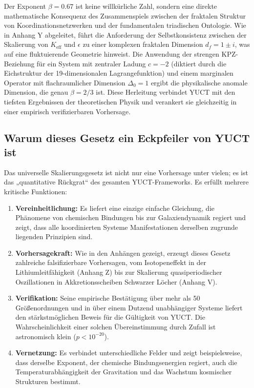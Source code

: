 \documentclass[11pt,a4paper]{article}
\begin{document}
	Der Exponent \(\beta = 0.67\) ist keine willkürliche Zahl, sondern eine direkte mathematische Konsequenz des Zusammenspiels zwischen der fraktalen Struktur von Koordinationsnetzwerken und der fundamentalen triadischen Ontologie. Wie in Anhang Y abgeleitet, führt die Anforderung der Selbstkonsistenz zwischen der Skalierung von \(K_{\mathrm{eff}}\) und \(\epsilon\) zu einer komplexen fraktalen Dimension \(d_f = 1 \pm i\), was auf eine fluktuierende Geometrie hinweist. Die Anwendung der strengen KPZ-Beziehung für ein System mit zentraler Ladung \(c = -2\) (diktiert durch die Eichstruktur der 19-dimensionalen Lagrangefunktion) und einem marginalen Operator mit flachraumlicher Dimension \(\Delta_0 = 1\) ergibt die physikalische anomale Dimension, die genau \(\beta = 2/3\) ist. Diese Herleitung verbindet YUCT mit den tiefsten Ergebnissen der theoretischen Physik und verankert sie gleichzeitig in einer empirisch verifizierbaren Vorhersage.
	
	\subsection{Warum dieses Gesetz ein Eckpfeiler von YUCT ist}
	
	Das universelle Skalierungsgesetz ist nicht nur eine Vorhersage unter vielen; es ist das „quantitative Rückgrat“ des gesamten YUCT-Frameworks. Es erfüllt mehrere kritische Funktionen:
	
	\begin{enumerate}
		\item \textbf{Vereinheitlichung:} Es liefert eine einzige einfache Gleichung, die Phänomene von chemischen Bindungen bis zur Galaxiendynamik regiert und zeigt, dass alle koordinierten Systeme Manifestationen derselben zugrunde liegenden Prinzipien sind.
		\item \textbf{Vorhersagekraft:} Wie in den Anhängen gezeigt, erzeugt dieses Gesetz zahlreiche falsifizierbare Vorhersagen, vom Isotopeneffekt in der Lithiumleitfähigkeit (Anhang Z) bis zur Skalierung quasiperiodischer Oszillationen in Akkretionsscheiben Schwarzer Löcher (Anhang V).
		\item \textbf{Verifikation:} Seine empirische Bestätigung über mehr als 50 Größenordnungen und in über einem Dutzend unabhängiger Systeme liefert den stärkstmöglichen Beweis für die Gültigkeit von YUCT. Die Wahrscheinlichkeit einer solchen Übereinstimmung durch Zufall ist astronomisch klein (\(p < 10^{-20}\)).
		\item \textbf{Vernetzung:} Es verbindet unterschiedliche Felder und zeigt beispielsweise, dass derselbe Exponent, der chemische Bindungsenergien regiert, auch die Temperaturabhängigkeit der Gravitation und das Wachstum kosmischer Strukturen bestimmt.
	\end{enumerate}
	
\end{document}
